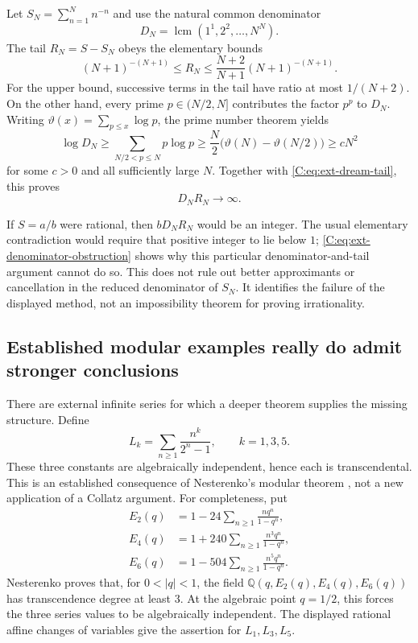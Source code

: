 \documentclass[11pt,a4paper]{article}
\theoremstyle{definition}
\theoremstyle{remark}
\numberwithin{equation}{section}
\begin{document}
Let $S_N=\sum_{n=1}^{N}n^{-n}$ and use the natural common denominator
\[
 D_N=\operatorname{lcm}(1^1,2^2,\ldots,N^N).
\]
The tail $R_N=S-S_N$ obeys the elementary bounds
\begin{equation}
 (N+1)^{-(N+1)}\le R_N
 \le\frac{N+2}{N+1}(N+1)^{-(N+1)}.
 \label{C:eq:ext-dream-tail}
\end{equation}
For the upper bound, successive terms in the tail have ratio at most
$1/(N+2)$.  On the other hand, every prime $p\in(N/2,N]$ contributes
the factor $p^p$ to $D_N$.  Writing
$\vartheta(x)=\sum_{p\le x}\log p$, the prime number theorem yields
\[
 \log D_N\ge\sum_{N/2<p\le N}p\log p
 \ge\frac N2\bigl(\vartheta(N)-\vartheta(N/2)\bigr)
 \ge cN^2
\]
for some $c>0$ and all sufficiently large $N$.  Together with
\eqref{C:eq:ext-dream-tail}, this proves
\begin{equation}
 D_NR_N\longrightarrow\infty.
 \label{C:eq:ext-denominator-obstruction}
\end{equation}

If $S=a/b$ were rational, then $bD_NR_N$ would be an integer.  The usual
elementary contradiction would require that positive integer to lie below
$1$; \eqref{C:eq:ext-denominator-obstruction} shows why this particular
denominator-and-tail argument cannot do so.  This does not rule out better
approximants or cancellation in the reduced denominator of $S_N$.  It
identifies the failure of the displayed method, not an impossibility theorem
for proving irrationality.

\subsection{Established modular examples really do admit stronger conclusions}

There are external infinite series for which a deeper theorem supplies
the missing structure.  Define
\[
 L_k=\sum_{n\ge1}\frac{n^k}{2^n-1},\qquad k=1,3,5.
\]
These three constants are algebraically independent, hence each is
transcendental.  This is an established consequence of Nesterenko's modular
theorem \cite{R088}, not a new application of a Collatz argument.
For completeness, put
\[
 \begin{split}
 E_2(q)&=1-24\sum_{n\ge1}\frac{nq^n}{1-q^n},\\
 E_4(q)&=1+240\sum_{n\ge1}\frac{n^3q^n}{1-q^n},\\
 E_6(q)&=1-504\sum_{n\ge1}\frac{n^5q^n}{1-q^n}.
 \end{split}
\]
Nesterenko proves that, for $0<|q|<1$, the field
$\mathbb Q(q,E_2(q),E_4(q),E_6(q))$ has transcendence degree at least
$3$.  At the algebraic point $q=1/2$, this forces the three series values
to be algebraically independent.  The displayed rational affine changes
of variables give the assertion for $L_1,L_3,L_5$.
\end{document}
